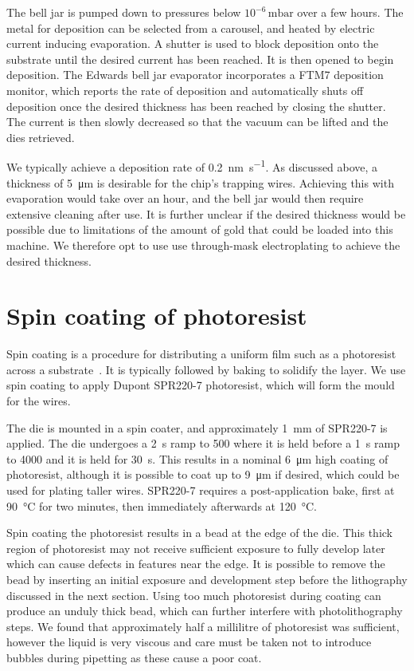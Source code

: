 The bell jar is pumped down to pressures below $10^{-6}\,\si{\milli\bar}$ over
a few hours. The metal for deposition can be selected from a carousel, and
heated by electric current inducing evaporation.  A shutter is used to block
deposition onto the substrate until the desired current has been reached. It is
then opened to begin deposition.  The Edwards bell jar evaporator incorporates
a FTM7 deposition monitor, which reports the rate of deposition and
automatically shuts off deposition once the desired thickness has been reached
by closing the shutter. The current is then slowly decreased so that the vacuum
can be lifted and the dies retrieved.

We typically achieve a deposition rate of \SI{0.2}{\nano\meter\per\second}. As
discussed above, a thickness of \SI{5}{\micro\meter} is desirable for the
chip's trapping wires. Achieving this with evaporation would take over an hour,
and the bell jar would then require extensive cleaning after use. It is further
unclear if the desired thickness would be possible due to limitations of the
amount of gold that could be loaded into this machine. We therefore opt to use
use through-mask electroplating to achieve the desired thickness.

\section{Spin coating of photoresist}
\label{fab:spin}

Spin coating is a procedure for distributing a uniform film such as a
photoresist  across a substrate~\cite{Cohen2011}. It is typically followed by
baking to solidify the layer. We use spin coating to apply Dupont SPR220-7
photoresist, which will form the mould for the wires.

The die is mounted in a spin coater, and approximately \SI{1}{\milli\meter} of
SPR220-7 is applied. The die undergoes a \SI{2}{\second} ramp to \SI{500}{\rpm}
where it is held before a \SI{1}{\second} ramp to \SI{4000}{\rpm} and it is
held for \SI{30}{\second}. This results in a nominal \SI{6}{\micro\meter} high
coating of photoresist, although it is possible to coat up to
\SI{9}{\micro\meter} if desired, which could be used for plating taller wires.
SPR220-7 requires a post-application bake, first at \SI{90}{\celsius} for two
minutes, then immediately afterwards at \SI{120}{\celsius}.

Spin coating the photoresist results in a bead at the edge of the die. This
thick region of photoresist may not receive sufficient exposure to fully
develop later which can cause defects in features near the edge. It is possible
to remove the bead by inserting an initial exposure and development step before
the lithography discussed in the next section. Using too much photoresist
during coating can produce an unduly thick bead, which can further interfere
with photolithography steps. We found that approximately half a millilitre of
photoresist was sufficient, however the liquid is very viscous and care must be
taken not to introduce bubbles during pipetting as these cause a poor coat.

